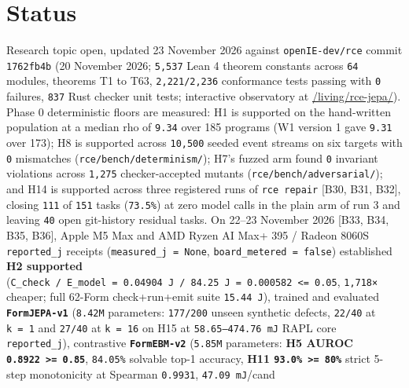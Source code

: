 \documentclass[10pt,letterpaper]{article}
\begin{document}
\section{Status}\label{status}

Research topic open, updated 23 November 2026 against
\texttt{openIE-\allowbreak{}dev/\allowbreak{}rce} commit \texttt{1762fb4b} (20 November 2026;
\texttt{5,537} Lean 4 theorem constants across \texttt{64} modules,
theorems T1 to T63, \texttt{2,\allowbreak{}221/\allowbreak{}2,\allowbreak{}236} conformance tests passing with
\texttt{0} failures, \texttt{837} Rust checker unit tests; interactive
observatory at
\href{https://research.openie.dev/living/rce-jepa/}{/living/rce-jepa/}).
Phase 0 deterministic floors are measured: H1 is supported on the
hand-written population at a median rho of \texttt{9.34} over 185
programs (W1 version 1 gave \texttt{9.31} over 173); H8 is supported
across \texttt{10,500} seeded event streams on six targets with
\texttt{0} mismatches (\texttt{rce/\allowbreak{}bench/\allowbreak{}determinism/\allowbreak{}}); H7's fuzzed arm
found \texttt{0} invariant violations across \texttt{1,275}
checker-accepted mutants (\texttt{rce/\allowbreak{}bench/\allowbreak{}adversarial/\allowbreak{}}); and H14 is
supported across three registered runs of \texttt{rce\ repair} {[}B30,
B31, B32{]}, closing \texttt{111} of \texttt{151} tasks
(\texttt{73.5\%}) at zero model calls in the plain arm of run 3 and
leaving \texttt{40} open git-history residual tasks. On 22--23 November
2026 {[}B33, B34, B35, B36{]}, Apple M5 Max and AMD Ryzen AI Max+ 395 /
Radeon 8060S \texttt{reported\_\allowbreak{}j} receipts
(\texttt{measured\_\allowbreak{}j\ =\ None}, \texttt{board\_\allowbreak{}metered\ =\ false})
established \textbf{H2 supported}
(\texttt{C\_check\ /\ E\_model\ =\ 0.04904\ J\ /\ 84.25\ J\ =\ 0.000582\ \textless{}=\ 0.05},
\texttt{1,718×} cheaper; full 62-Form check+run+emit suite
\texttt{15.44\ J}), trained and evaluated \textbf{\texttt{FormJEPA-\allowbreak{}v1}}
(\texttt{8.42M} parameters: \texttt{177/200} unseen synthetic defects,
\texttt{22/40} at \texttt{k\ =\ 1} and \texttt{27/40} at
\texttt{k\ =\ 16} on H15 at \texttt{58.\allowbreak{}65–474.\allowbreak{}76\ mJ} RAPL core
\texttt{reported\_\allowbreak{}j}), contrastive \textbf{\texttt{FormEBM-\allowbreak{}v2}}
(\texttt{5.85M} parameters: \textbf{H5 AUROC
\texttt{0.8922\ \textgreater{}=\ 0.85}}, \texttt{84.05\%} solvable top-1
accuracy, \textbf{H11 \texttt{93.0\%\ \textgreater{}=\ 80\%}} strict
5-step monotonicity at Spearman \texttt{0.9931}, \texttt{47.09\ mJ}/\allowbreak{}cand
\end{document}
